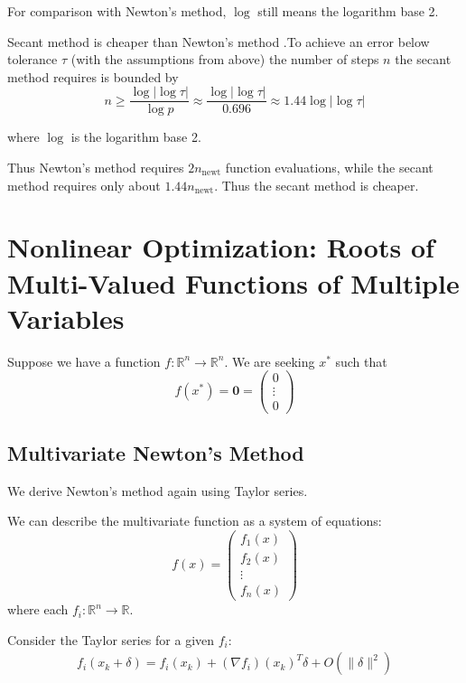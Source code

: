 \documentclass[12pt,letterpaper]{article}
\newcommand{\R}{\mathbb{R}}
\begin{document}
For comparison with Newton's method, $\log$ still means the logarithm base 2.

\begin{theo}{Secant method is cheaper than Newton's method}
.To achieve an error below tolerance $\tau$ (with the assumptions from above) the number of steps $n$ the secant method requires is bounded by
\begin{equation}
	n \geq \frac{\log \lvert \log \tau \lvert}{\log p} \approx \frac{\log \lvert \log \tau \lvert}{0.696}
	\approx 1.44 \log \lvert \log \tau \lvert
\end{equation}

where $\log$ is the logarithm base 2.

Thus Newton's method requires $2 n_{\text{newt}}$ function evaluations, while the secant method requires only about $1.44 n_{\text{newt}}$. Thus the secant method is cheaper.
\end{theo}

\section{Nonlinear Optimization: Roots of Multi-Valued Functions of Multiple Variables}
Suppose we have a function $f : \R^n \rightarrow \R^n$. We are seeking $x^*$ such that
\begin{equation}
f(x^*) = \mathbf{0} = \begin{pmatrix}
	0 \\ \vdots \\ 0
\end{pmatrix}
\end{equation}

\subsection{Multivariate Newton's Method}
We derive Newton's method again using Taylor series.

We can describe the multivariate function as a system of equations:
\begin{equation}
f(x) = \begin{pmatrix}
	f_1(x) \\ f_2(x) \\ \vdots \\ f_n(x)
\end{pmatrix}
\end{equation}
where each $f_i : \R^n \rightarrow \R$.

Consider the Taylor series for a given $f_i$:
\begin{align}
	f_i(x_k + \delta) = f_i(x_k) + (\nabla f_i)(x_k)^T \delta + O(\lVert \delta \rVert^2)
\end{align}
\end{document}

